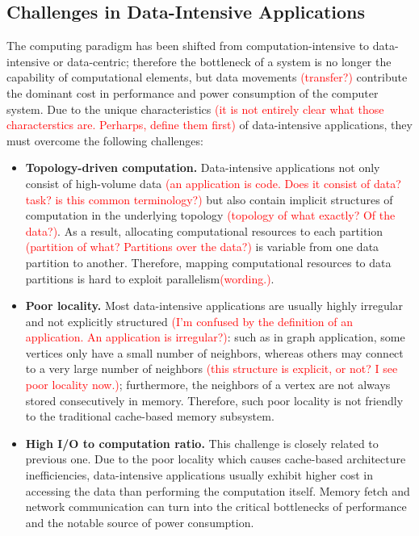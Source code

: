 \documentclass[letterpaper, 11pt, conference, margin=1in]{ieeeconf}   %
\newcommand\myworries[1]{\textcolor{red}{(#1)}}
\begin{document}
\subsection{\bf Challenges in Data-Intensive Applications}
The computing paradigm has been shifted from computation-intensive to data-intensive or data-centric; therefore the bottleneck of a system is no longer the capability of computational elements, but data movements \myworries{transfer?} contribute the dominant cost in performance and power consumption of the computer system. Due to the unique characteristics \myworries{it is not entirely clear what those characterstics are. Perharps, define them first} of data-intensive applications, they must overcome the following challenges:
\begin{itemize}
  \item \textbf{Topology-driven computation.} Data-intensive applications not only consist of high-volume data \myworries{an application is code. Does it consist of data? task? is this common terminology?} but also contain implicit structures of computation in the underlying topology \myworries{topology of what exactly? Of the data?}. As a result, allocating computational resources to each partition \myworries{partition of what? Partitions over the data?} is variable from one data partition to another. Therefore, mapping computational resources to data partitions is hard to exploit parallelism\myworries{wording.}.
  \item \textbf{Poor locality.} Most data-intensive applications are usually highly irregular and not explicitly structured \myworries{I'm confused by the definition of an application. An application is irregular?}: such as in graph application, some vertices only have a small number of neighbors, whereas others may connect to a very large number of neighbors \myworries{this structure is explicit, or not? I see poor locality now.}; furthermore, the neighbors of a vertex are not always stored consecutively in memory. Therefore, such poor locality is not friendly to the traditional cache-based memory subsystem.
  \item \textbf{High I/O to computation ratio.} This challenge is closely related to previous one. Due to the poor locality which causes cache-based architecture inefficiencies, data-intensive applications usually exhibit higher cost in accessing the data than performing the computation itself. Memory fetch and network communication can turn into the critical bottlenecks of performance and the notable source of power consumption.

\end{itemize}
\end{document}
